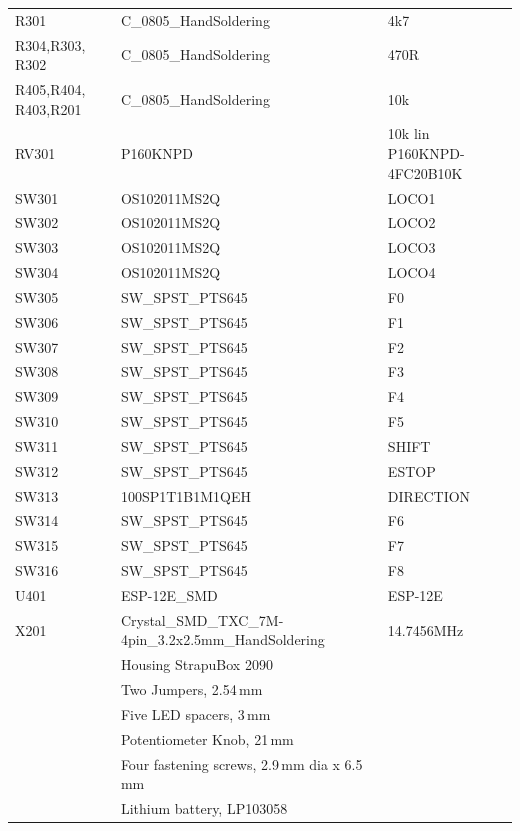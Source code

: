 \documentclass[11pt,a4paper]{scrartcl}
\begin{document}
\begin{table}
\begin{footnotesize}
\begin{tabular}{|m{5em}|l|l|}
      R301 & C\_0805\_HandSoldering & 4k7 \\
      R304,R303, R302 & C\_0805\_HandSoldering & 470R \\
      R405,R404, R403,R201 & C\_0805\_HandSoldering & 10k \\
      RV301 & P160KNPD & 10k lin P160KNPD-4FC20B10K \\
      SW301 & OS102011MS2Q & LOCO1 \\
      SW302 & OS102011MS2Q & LOCO2 \\
      SW303 & OS102011MS2Q & LOCO3 \\
      SW304 & OS102011MS2Q & LOCO4 \\
      SW305 & SW\_SPST\_PTS645 & F0 \\
      SW306 & SW\_SPST\_PTS645 & F1 \\
      SW307 & SW\_SPST\_PTS645 & F2 \\
      SW308 & SW\_SPST\_PTS645 & F3 \\
      SW309 & SW\_SPST\_PTS645 & F4 \\
      SW310 & SW\_SPST\_PTS645 & F5 \\
      SW311 & SW\_SPST\_PTS645 & SHIFT \\
      SW312 & SW\_SPST\_PTS645 & ESTOP \\
      SW313 & 100SP1T1B1M1QEH & DIRECTION \\
      SW314 & SW\_SPST\_PTS645 & F6 \\
      SW315 & SW\_SPST\_PTS645 & F7 \\
      SW316 & SW\_SPST\_PTS645 & F8 \\
      U401 & ESP-12E\_SMD & ESP-12E \\
      X201 & Crystal\_SMD\_TXC\_7M-4pin\_3.2x2.5mm\_HandSoldering & 14.7456MHz \\
      \hline
      & Housing StrapuBox 2090 & \\
      & Two Jumpers, 2.54\,mm & \\
      & Five LED spacers, 3\,mm & \\
      & Potentiometer Knob, 21\,mm & \\
      & Four fastening screws, 2.9\,mm dia x 6.5\,mm & \\
      & Lithium battery, LP103058 & \\
      \hline
    \end{tabular}
  \end{footnotesize}
\end{table}

\end{document}
